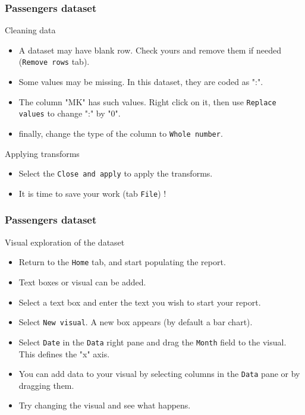 \begin{frame}
    \frametitle{Passengers dataset}
\begin{block}{Cleaning data}
    \begin{itemize}
        \item<+-> A dataset may have blank row. Check yours and remove
        them if needed (\texttt{Remove rows} tab).
        \item<+-> Some values may be missing. In this dataset, they are coded 
        as ":". 
        \item<+-> The column "MK" has such values. Right click on it, then use 
        \texttt{Replace values} to change ":" by "0".
        \item<+-> finally, change the type of the column to \texttt{Whole number}.
    \end{itemize}
\end{block}    
   \begin{block}{Applying transforms}
    \begin{itemize}
        \item<+-> Select the \texttt{Close and apply} to apply the transforms.
        \item<+-> It is time to save your work (tab \texttt{File}) ! 
    \end{itemize}
   \end{block} 
\end{frame}
\begin{frame}
    \frametitle{Passengers dataset}
\begin{block}{Visual exploration of the dataset}
    \begin{itemize}
        \item<+-> Return to the \texttt{Home} tab, and start populating the report.
        \item<+-> Text boxes or visual can be added. 
        \item<+-> Select a text box and enter the text you wish to start your report.
        \item<+-> Select \texttt{New visual}. A new box appears (by default a bar chart).
        \item<+-> Select \texttt{Date} in the \texttt{Data} right pane and drag 
        the \texttt{Month} field to the visual. This defines the "x" axis.
        \item<+-> You can add data to your visual by selecting columns in the \texttt{Data} pane 
        or by dragging them. 
        \item<+-> Try changing the visual and see what happens.
    \end{itemize}
\end{block}
\end{frame}
